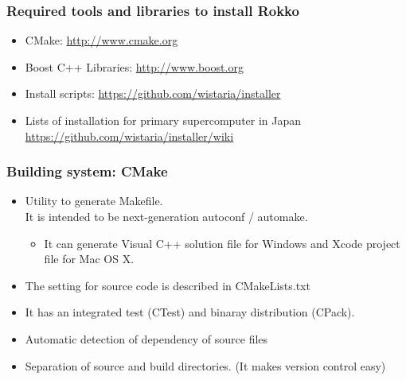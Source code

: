 \begin{frame}
  \frametitle{Required tools and libraries to install Rokko}
  \begin{itemize}
    \setlength{\itemsep}{1em}
  \item CMake: \url{http://www.cmake.org}
  \item Boost C++ Libraries: \url{http://www.boost.org}
  \item Install scripts: \url{https://github.com/wistaria/installer}
  \item Lists of installation for primary supercomputer in Japan \\
    \url{https://github.com/wistaria/installer/wiki}
  \end{itemize}
\end{frame}


\begin{frame}
  \frametitle{Building system: CMake}
  \begin{itemize}
    \setlength{\itemsep}{1em}
  \item Utility to generate Makefile.\\
  It is intended to be next-generation autoconf / automake.
    \begin{itemize}
    \item It can generate Visual C++ solution file for Windows and Xcode project file for Mac OS X.
    \end{itemize}
  \item The setting for source code is described in CMakeLists.txt
  \item It has an integrated test (CTest) and binaray distribution (CPack).
  \item Automatic detection of dependency of source files
  \item Separation of source and build directories. (It makes version control easy)
  \end{itemize}
\end{frame}


